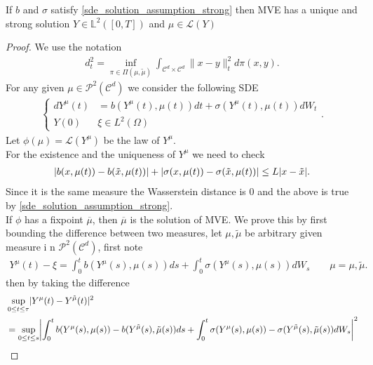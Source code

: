 \begin{theorem}\label{solution_vlasov}
  If $b$ and $\sigma $ satisfy \autoref{sde_solution_assumption_strong} then MVE has a unique and strong solution
  $Y \in  \mathbb{L}^2([0,T])$ and $\mu  \in  \mathcal{L}(Y)$
\end{theorem}
\begin{proof}
 We use the notation 
 \begin{align*}
   d_t^2 =  \inf_{\pi  \in  \Pi(\mu,\tilde{\mu } )} \int_{\mathcal{C}^{d} \times  \mathcal{C}^{d}  }\|x-y\|^2_t d\pi(x,y)
 .\end{align*}
 For any given $\mu  \in \mathcal{P}^2(\mathcal{C}^{d} )$ we consider the following SDE 
 \begin{align*}
   \begin{cases} 
   dY^{\mu } (t) &= b(Y^{\mu} (t),\mu(t))dt + \sigma(Y^{\mu } (t),\mu(t))dW_t\\
    Y(0)   & \xi \in  L^2(\Omega)
   \end{cases}
 .\end{align*}
 Let $\phi(\mu ) = \mathcal{L}(Y^{\mu } ) $ be the law of $Y^{\mu} $. \\[1ex]
 For the existence  and the uniqueness of $Y^{\mu } $ we need to check 
 \begin{align*}
   \lvert b(x,\mu(t)) - b(\tilde{x},\mu(t) )\rvert + \lvert\sigma(x,\mu(t)) - \sigma(\tilde{x},\mu(t))\rvert \le  L \lvert x-\tilde{x} \rvert
 .\end{align*}
 Since it is the same measure the Wasserstein distance is 0 and the above is true by \autoref{sde_solution_assumption_strong}.\\
 If $\phi $ has a fixpoint $\overline{\mu } $, then $\overline{\mu } $ is the solution of MVE.
 We prove this by first bounding the difference between two measures, let $\mu ,\tilde{\mu }$ be arbitrary given measure i n
 $\mathcal{P}^2(\mathcal{C}^{d} )$, first note
 \begin{align*}
  Y^{\mu }(t) - \xi = \int_0^{t} b(Y^{\mu }(s),\mu(s) ) ds + \int_0^{t} \sigma(Y^{\mu }(s),\mu(s) ) dW_s \qquad \mu= \mu,\tilde{\mu} 
 .\end{align*}
 then by taking the difference 
 \begin{align*}
   &\sup_{0\le t \le \tau }\abs{Y^{\mu }(t) - Y^{\tilde{\mu } }(t)}^2 \\
   &= \sup_{0\le t \le s}\abs*{\int_0^{t} b(Y^{\mu }(s),\mu(s) )- b(Y^{\tilde{\mu}}(s),\tilde{\mu}(s) ) ds + \int_0^{t} \sigma(Y^{\mu }(s),\mu(s) ) - \sigma (Y^{\tilde{\mu}}(s),\tilde{\mu}(s) ) dW_s}^2\\

\end{align*}
\end{proof}
